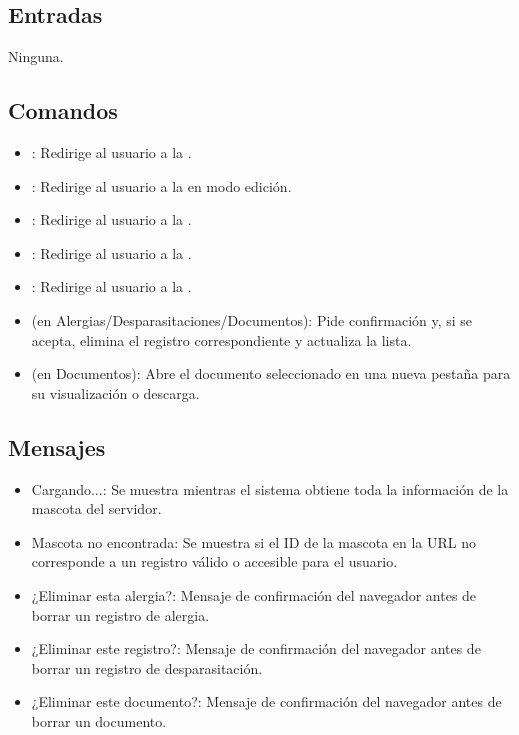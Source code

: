 \subsection{Entradas}
    Ninguna.

\subsection{Comandos}
\begin{itemize}
    \item {}: Redirige al usuario a la .
    \item {}: Redirige al usuario a la  en modo edición.
    \item {}: Redirige al usuario a la .
    \item {}: Redirige al usuario a la .
    \item {}: Redirige al usuario a la .
    \item {} (en Alergias/Desparasitaciones/Documentos): Pide confirmación y, si se acepta, elimina el registro correspondiente y actualiza la lista.
    \item {} (en Documentos): Abre el documento seleccionado en una nueva pestaña para su visualización o descarga.
\end{itemize}

\subsection{Mensajes}
\begin{itemize}
    \item Cargando...: Se muestra mientras el sistema obtiene toda la información de la mascota del servidor.
    \item Mascota no encontrada: Se muestra si el ID de la mascota en la URL no corresponde a un registro válido o accesible para el usuario.
    \item ¿Eliminar esta alergia?: Mensaje de confirmación del navegador antes de borrar un registro de alergia.
    \item ¿Eliminar este registro?: Mensaje de confirmación del navegador antes de borrar un registro de desparasitación.
    \item ¿Eliminar este documento?: Mensaje de confirmación del navegador antes de borrar un documento.
\end{itemize}


